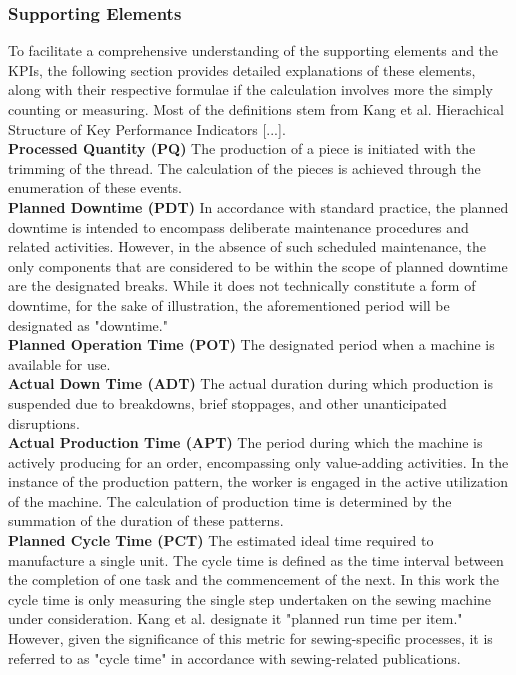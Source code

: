 {\subsubsection{Supporting Elements}
To facilitate a comprehensive understanding of the supporting elements and the KPIs, the following section provides detailed explanations of these elements, along with their respective formulae if the calculation involves more the simply counting or measuring. Most of the definitions stem from Kang et al. \cite{kangHierarchicalStructureKey2016} Hierachical Structure of Key Performance Indicators [...].\\

\textbf{Processed Quantity (PQ)}
The production of a piece is initiated with the trimming of the thread. The calculation of the pieces is achieved through the enumeration of these events.\\
\textbf{Planned Downtime (PDT)}
In accordance with standard practice, the planned downtime is intended to encompass deliberate maintenance procedures and related activities. However, in the absence of such scheduled maintenance, the only components that are considered to be within the scope of planned downtime are the designated breaks. While it does not technically constitute a form of downtime, for the sake of illustration, the aforementioned period will be designated as "downtime." \\
\textbf{Planned Operation Time (POT)}
The designated period when a machine is available for use. \\
\textbf{Actual Down Time (ADT)}
The actual duration during which production is suspended due to breakdowns, brief stoppages, and other unanticipated disruptions.\\
\textbf{Actual Production Time (APT)}
The period during which the machine is actively producing for an order, encompassing only value-adding activities.
In the instance of the production pattern, the worker is engaged in the active utilization of the machine. The calculation of production time is determined by the summation of the duration of these patterns.\\
\textbf{Planned Cycle Time (PCT)}
The estimated ideal time required to manufacture a single unit. The cycle time is defined as the time interval between the completion of one task and the commencement of the next. In this work the cycle time is only measuring the single step undertaken on the sewing machine under consideration. Kang et al. designate it "planned run time per item." However, given the significance of this metric for sewing-specific processes, it is referred to as "cycle time" in accordance with sewing-related publications.\\
}
